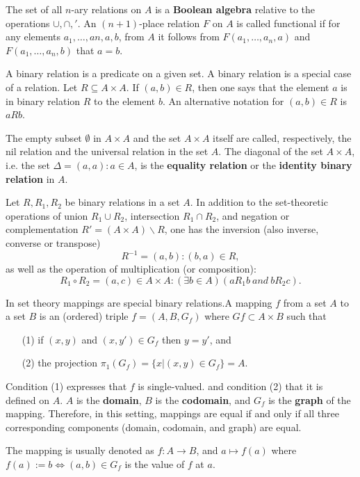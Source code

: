 The set of all $n$-ary relations on $A$ is a \textbf{Boolean algebra} relative to the operations $\cup, \cap, '$.
An $(n+1)$-place relation $F$ on $A$ is called functional if for any elements $a_1,\dots,an, a,b$, from $A$
it follows from $F(a_1,\dots,a_n,a)$ and $F(a_1,\dots,a_n,b)$ that $a=b$.

\begin{definition}
	\cite{2}
	A binary relation is a predicate on a given set.
	A binary relation is a special case of a relation. Let $R \subseteq A \times A$.
	If $(a,b) \in R$, then one says that the element $a$ is in binary relation $R$ to the element $b$.
	An alternative notation for $(a,b) \in R$ is $aRb$.

	The empty subset $\emptyset$ in $A\times A$ and the set $A\times A$ itself are called, respectively,
	the nil relation and the universal relation in the set $A$.
	The diagonal of the set $A\times A$, i.e. the set $\Delta={(a,a):a\in A}$,
	is the \textbf{equality relation} or the \textbf{identity binary relation} in $A$.

\end{definition}

Let $R,R_1,R_2$ be binary relations in a set $A$. In addition to the set-theoretic operations of union $R_1\cup R_2$,
intersection $R_1\cap R_2$, and negation or complementation $R'=(A\times A)\backslash R$,
one has the inversion (also inverse, converse or transpose)
\[R^{-1}={(a,b):(b,a)\in R},\]
as well as the operation of multiplication (or composition):
\[R_1\circ R_2={(a,c)∈A\times A:(\exists b\in A)(aR_1b\ and\ bR_2c)}.\]

\begin{definition}[Mapping]
	\cite{3}
	In set theory mappings are special binary relations.A mapping $f$ from a set $A$ to a set $B$ is an (ordered) triple $f=(A,B,G_f)$
 	where $Gf\subset A\times B$ such that

	\begin{itemize}
		\item[(1)] if $(x,y)$ and $(x,y')\in G_f$ then $y=y'$, and
		\item[(2)] the projection $\pi_1(G_f)=\{x|(x,y)\in G_f\}=A.$
	\end{itemize}

	Condition (1) expresses that $f$ is single-valued. and condition (2) that it is defined on $A$.
	$A$ is the \textbf{domain}, $B$ is the \textbf{codomain}, and $G_f$ is the \textbf{graph} of the mapping. Therefore, in this setting, mappings are equal if and only if all three corresponding components (domain, codomain, and graph) are equal.
	
	The mapping is usually denoted as $f:A\to B$, and $a\mapsto f(a)$ where $f(a):=b\Leftrightarrow (a,b)\in G_f$ is the value of $f$ at $a$.

\end{definition}

